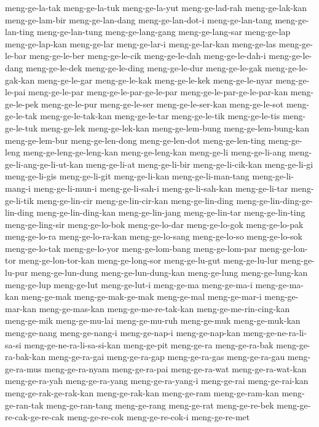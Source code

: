 {meng-ge-la-tak meng-ge-la-tuk meng-ge-la-yut meng-ge-lad-rah
meng-ge-lak-kan meng-ge-lam-bir meng-ge-lan-dang meng-ge-lan-dot-i
meng-ge-lan-tang meng-ge-lan-ting meng-ge-lan-tung meng-ge-lang-gang
meng-ge-lang-sar meng-ge-lap meng-ge-lap-kan meng-ge-lar meng-ge-lar-i
meng-ge-lar-kan meng-ge-las meng-ge-le-bar meng-ge-le-ber meng-ge-le-cik
meng-ge-le-dah meng-ge-le-dah-i meng-ge-le-dang meng-ge-le-dek
meng-ge-le-ding meng-ge-le-dur meng-ge-le-gak meng-ge-le-gak-kan
meng-ge-le-gar meng-ge-le-kak meng-ge-le-kek meng-ge-le-nyar
meng-ge-le-pai meng-ge-le-par meng-ge-le-par-ge-le-par
meng-ge-le-par-ge-le-par-kan meng-ge-le-pek meng-ge-le-pur meng-ge-le-ser
meng-ge-le-ser-kan meng-ge-le-sot meng-ge-le-tak meng-ge-le-tak-kan
meng-ge-le-tar meng-ge-le-tik meng-ge-le-tis meng-ge-le-tuk meng-ge-lek
meng-ge-lek-kan meng-ge-lem-bung meng-ge-lem-bung-kan meng-ge-lem-bur
meng-ge-len-dong meng-ge-len-dot meng-ge-len-ting meng-ge-leng
meng-ge-leng-ge-leng-kan meng-ge-leng-kan meng-ge-li meng-ge-li-ang
meng-ge-li-ang-ge-li-ut-kan meng-ge-li-at meng-ge-li-bir
meng-ge-li-cik-kan meng-ge-li-gi meng-ge-li-gis meng-ge-li-git
meng-ge-li-kan meng-ge-li-man-tang meng-ge-li-mang-i meng-ge-li-mun-i
meng-ge-li-sah-i meng-ge-li-sah-kan meng-ge-li-tar meng-ge-li-tik
meng-ge-lin-cir meng-ge-lin-cir-kan meng-ge-lin-ding
meng-ge-lin-ding-ge-lin-ding meng-ge-lin-ding-kan meng-ge-lin-jang
meng-ge-lin-tar meng-ge-lin-ting meng-ge-ling-sir meng-ge-lo-bok
meng-ge-lo-dar meng-ge-lo-gok meng-ge-lo-pak meng-ge-lo-ra
meng-ge-lo-ra-kan meng-ge-lo-sang meng-ge-lo-so meng-ge-lo-sok
meng-ge-lo-tak meng-ge-lo-yor meng-ge-lom-bang meng-ge-lom-par
meng-ge-lon-tor meng-ge-lon-tor-kan meng-ge-long-sor meng-ge-lu-gut
meng-ge-lu-lur meng-ge-lu-pur meng-ge-lun-dung meng-ge-lun-dung-kan
meng-ge-lung meng-ge-lung-kan meng-ge-lup meng-ge-lut meng-ge-lut-i
meng-ge-ma meng-ge-ma-i meng-ge-ma-kan meng-ge-mak meng-ge-mak-ge-mak
meng-ge-mal meng-ge-mar-i meng-ge-mar-kan meng-ge-mas-kan
meng-ge-me-re-tak-kan meng-ge-me-rin-cing-kan meng-ge-mik meng-ge-mu-lai
meng-ge-mu-ruh meng-ge-muk meng-ge-muk-kan meng-ge-nang meng-ge-nang-i
meng-ge-nap-i meng-ge-nap-kan meng-ge-ne-ra-li-sa-si
meng-ge-ne-ra-li-sa-si-kan meng-ge-pit meng-ge-ra meng-ge-ra-bak
meng-ge-ra-bak-kan meng-ge-ra-gai meng-ge-ra-gap meng-ge-ra-gas
meng-ge-ra-gau meng-ge-ra-mus meng-ge-ra-nyam meng-ge-ra-pai
meng-ge-ra-wat meng-ge-ra-wat-kan meng-ge-ra-yah meng-ge-ra-yang
meng-ge-ra-yang-i meng-ge-rai meng-ge-rai-kan meng-ge-rak-ge-rak-kan
meng-ge-rak-kan meng-ge-ram meng-ge-ram-kan meng-ge-ran-tak
meng-ge-ran-tang meng-ge-rang meng-ge-rat meng-ge-re-bek
meng-ge-re-cak-ge-re-cak meng-ge-re-cok meng-ge-re-cok-i meng-ge-re-met
}
